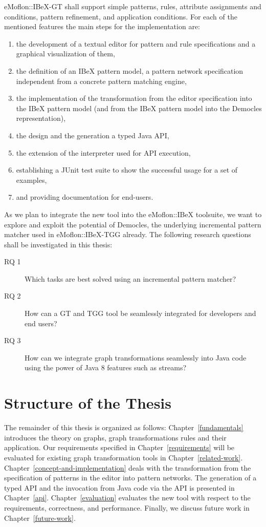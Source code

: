 eMoflon::IBeX-GT shall support simple patterns, rules, attribute assignments and conditions, pattern refinement, and application conditions.
For each of the mentioned features the main steps for the implementation are:
\begin{enumerate}
	\item the development of a textual editor for pattern and rule specifications and a graphical visualization of them,
	\item the definition of an IBeX pattern model, \ie a pattern network specification independent from a concrete pattern matching engine,
	\item the implementation of the transformation from the editor specification into the IBeX pattern model (and from the IBeX pattern model into the Democles representation),
	\item the design and the generation a typed Java API,
	\item the extension of the interpreter used for API execution,
	\item establishing a JUnit test suite to show the successful usage for a set of examples,
	\item and providing documentation for end-users.
\end{enumerate}

\noindent
As we plan to integrate the new tool into the eMoflon::IBeX toolsuite, we want to explore and exploit the potential of Democles, the underlying incremental pattern matcher used in eMoflon::IBeX-TGG already.
The following research questions shall be investigated in this thesis:
\begin{description}
	\item[RQ 1]
		Which tasks are best solved using an incremental pattern matcher?
	\item[RQ 2]
		How can a GT and TGG tool be seamlessly integrated for developers and end users?
	\item[RQ 3]
		How can we integrate graph transformations seamlessly into Java code using the power of Java 8 features such as streams?
\end{description}

\section{Structure of the Thesis}
The remainder of this thesis is organized as follows:
Chapter~\ref{fundamentals} introduces the theory on graphs, graph transformations rules and their application.
Our requirements specified in Chapter~\ref{requirements} will be evaluated for existing graph transformation tools in Chapter~\ref{related-work}.
Chapter~\ref{concept-and-implementation} deals with the transformation from the specification of patterns in the editor into pattern networks.
The generation of a typed API and the invocation from Java code via the API is presented in Chapter~\ref{api}.
Chapter~\ref{evaluation} evaluates the new tool with respect to the requirements, correctness, and performance.
Finally, we discuss future work in Chapter~\ref{future-work}.
